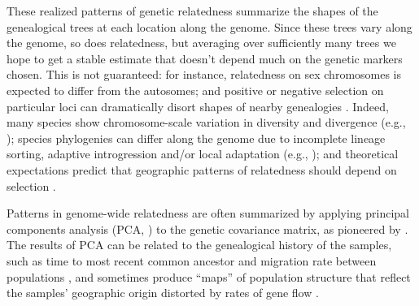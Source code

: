\documentclass[11pt, oneside]{article}   	%
\newcommand\citet{\cite}
\newcommand\citep{\cite}
\begin{document}
These realized patterns of genetic relatedness
summarize the shapes of the genealogical trees %
at each location along the genome.
Since these trees vary along the genome, so does relatedness,
but averaging over sufficiently many trees we hope to get a stable estimate
that doesn't depend much on the genetic markers chosen.
This is not guaranteed:
for instance,
relatedness on sex chromosomes is expected to differ from the autosomes;
and positive or negative selection on particular loci can dramatically disort shapes of nearby genealogies
\citep{kim2002hitchhiking,charlesworth1993effect,barton2000genetic}.
Indeed,
many species show chromosome-scale variation in diversity and divergence
(e.g., \citet{langley2012genomic});
species phylogenies can differ along the genome 
due to incomplete lineage sorting,
adaptive introgression and/or local adaptation 
(e.g., \citet{pease2013accurate,ellegren2012genomic,nadeau2012genomic,pool2015natural,vernot2014resurrecting});
and theoretical expectations predict that geographic patterns of relatedness should depend on selection
\citep{charlesworth2003review}.

Patterns in genome-wide relatedness are often summarized
by applying principal components analysis (PCA, \citet{patterson2006population}) 
to the genetic covariance matrix,
as pioneered by \citet{menozzi1978synthetic}.
The results of PCA can be related to the genealogical history of the samples, 
such as time to most recent common ancestor and migration rate between populations \citep{novembre2008interpreting,mcvean2009genealogical}, 
and sometimes produce ``maps'' of population structure
that reflect the samples' geographic origin distorted by rates of gene flow
\citep{novembre2008genes}.
\end{document}
